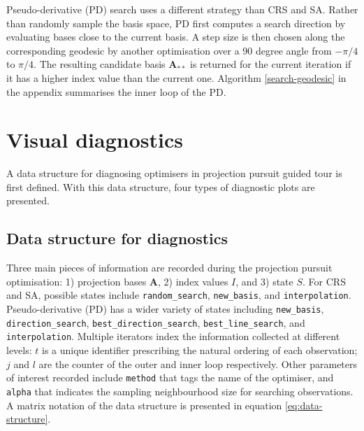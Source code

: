 Pseudo-derivative (PD) search uses a different strategy than CRS and SA.
Rather than randomly sample the basis space, PD first computes a search
direction by evaluating bases close to the current basis. A step size is
then chosen along the corresponding geodesic by another optimisation
over a 90 degree angle from \(-\pi/4\) to \(\pi/4\). The resulting
candidate basis \(\mathbf{A}_{**}\) is returned for the current
iteration if it has a higher index value than the current one. Algorithm
\ref{search-geodesic} in the appendix summarises the inner loop of the
PD.

\hypertarget{vis-diag}{%
\section{Visual diagnostics}\label{vis-diag}}

A data structure for diagnosing optimisers in projection pursuit guided
tour is first defined. With this data structure, four types of
diagnostic plots are presented.

\hypertarget{data-structure-for-diagnostics}{%
\subsection{Data structure for
diagnostics}\label{data-structure-for-diagnostics}}

Three main pieces of information are recorded during the projection
pursuit optimisation: 1) projection bases \(\mathbf{A}\), 2) index
values \(I\), and 3) state \(S\). For CRS and SA, possible states
include \texttt{random\_search}, \texttt{new\_basis}, and
\texttt{interpolation}. Pseudo-derivative (PD) has a wider variety of
states including \texttt{new\_basis}, \texttt{direction\_search},
\texttt{best\_direction\_search}, \texttt{best\_line\_search}, and
\texttt{interpolation}. Multiple iterators index the information
collected at different levels: \(t\) is a unique identifier prescribing
the natural ordering of each observation; \(j\) and \(l\) are the
counter of the outer and inner loop respectively. Other parameters of
interest recorded include \texttt{method} that tags the name of the
optimiser, and \texttt{alpha} that indicates the sampling neighbourhood
size for searching observations. A matrix notation of the data structure
is presented in equation \ref{eq:data-structure}.

